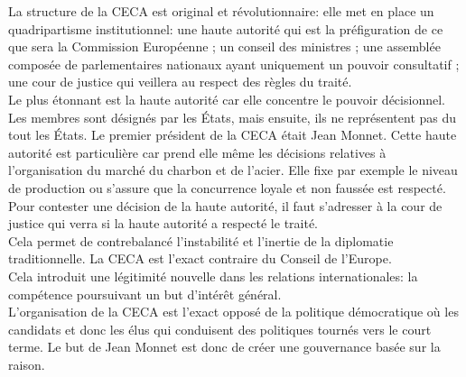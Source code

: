 \documentclass[12pt, a4paper, openany]{book}
\begin{document}
La structure de la CECA est original et révolutionnaire: elle met en place un quadripartisme institutionnel: une haute autorité qui est la préfiguration de ce que sera la Commission Européenne ; un conseil des ministres ; une assemblée composée de parlementaires nationaux ayant uniquement un pouvoir consultatif ; une cour de justice qui veillera au respect des règles du traité. \\
Le plus étonnant est la haute autorité car elle concentre le pouvoir décisionnel. Les membres sont désignés par les États, mais ensuite, ils ne représentent pas du tout les États. Le premier président de la CECA était Jean Monnet. Cette haute autorité est particulière car prend elle même les décisions relatives à l'organisation du marché du charbon et de l'acier. Elle fixe par exemple le niveau de production ou s'assure que la concurrence loyale et non faussée est respecté. Pour contester une décision de la haute autorité, il faut s'adresser à la cour de justice qui verra si la haute autorité a respecté le traité. \\
Cela permet de contrebalancé l'instabilité et l'inertie de la diplomatie traditionnelle. La CECA est l'exact contraire du Conseil de l'Europe. \\
Cela introduit une légitimité nouvelle dans les relations internationales: la compétence poursuivant un but d'intérêt général. \\
L'organisation de la CECA est l'exact opposé de la politique démocratique où les candidats et donc les élus qui conduisent des politiques tournés vers le court terme. Le but de Jean Monnet est donc de créer une gouvernance basée sur la raison.
\end{document}
